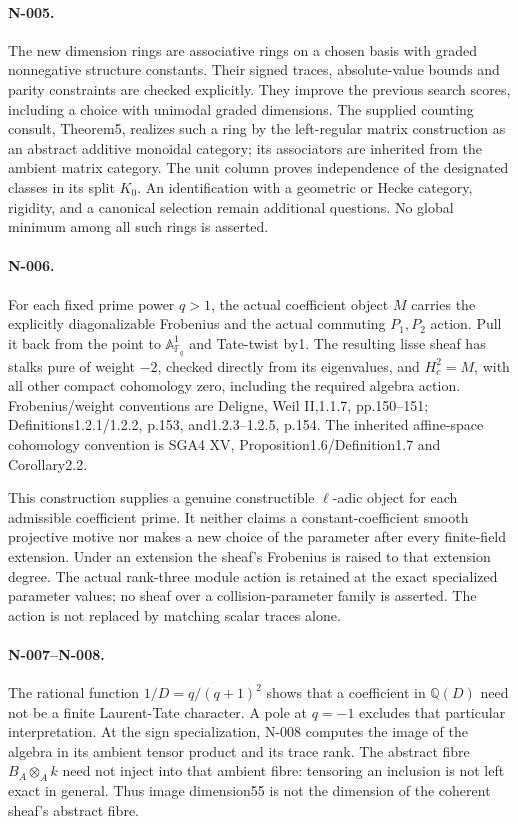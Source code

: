 \paragraph{N-005.}
The new dimension rings are associative rings on a chosen
basis with graded nonnegative structure constants.  Their
signed traces, absolute-value bounds and parity constraints
are checked explicitly.  They improve the previous search
scores, including a choice with unimodal graded dimensions.
The supplied counting consult, Theorem5, realizes such a ring
by the left-regular matrix construction as an abstract additive
monoidal category; its associators are inherited from the
ambient matrix category.  The unit column proves independence
of the designated classes in its split $K_0$.
An identification with a geometric or Hecke category, rigidity,
and a canonical selection remain additional questions.  No global
minimum among all such rings is asserted.

\paragraph{N-006.}
For each fixed prime power $q>1$, the actual coefficient
object $M$ carries the explicitly diagonalizable Frobenius
and the actual commuting $P_1,P_2$ action.  Pull it back from
the point to $\mathbb A^1_{\mathbb F_q}$ and Tate-twist by1.
The resulting lisse sheaf has stalks pure of weight $-2$,
checked directly from its eigenvalues, and
$H_c^2=M$, with all other compact cohomology zero, including
the required algebra action.  Frobenius/weight conventions
are Deligne, Weil II,1.1.7, pp.150--151;
Definitions1.2.1/1.2.2, p.153, and1.2.3--1.2.5, p.154.
The inherited affine-space cohomology convention is SGA4 XV,
Proposition1.6/Definition1.7 and Corollary2.2.

This construction supplies a genuine constructible
$\ell$-adic object for each admissible coefficient prime.
It neither claims a constant-coefficient smooth projective
motive nor makes a new choice of the parameter after every
finite-field extension.  Under an extension the sheaf's
Frobenius is raised to that extension degree.  The actual
rank-three module action is retained at the exact specialized
parameter values; no sheaf over a collision-parameter family is
asserted.  The action is not replaced by matching scalar traces alone.

\paragraph{N-007--N-008.}
The rational function $1/D=q/(q+1)^2$ shows that a coefficient
in $\mathbb Q(D)$ need not be a finite Laurent-Tate character.
A pole at $q=-1$ excludes that particular interpretation.
At the sign specialization, N-008 computes the image of the
algebra in its ambient tensor product and its trace rank.
The abstract fibre $B_A\otimes_A k$ need not inject into that
ambient fibre: tensoring an inclusion is not left exact in
general.  Thus image dimension55 is not the dimension of
the coherent sheaf's abstract fibre.

